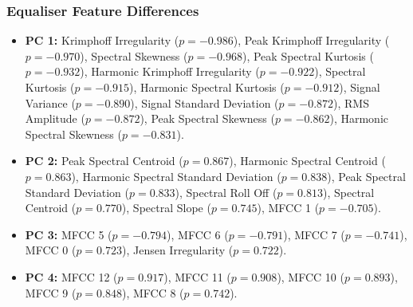 		\subsubsection*{Equaliser Feature Differences}
			\begin{itemize}
				\item {\bf{PC 1:}} Krimphoff Irregularity ($p = -0.986$), Peak Krimphoff Irregularity ($p =
					-0.970$), Spectral Skewness ($p = -0.968$), Peak Spectral Kurtosis ($p = -0.932$),
					Harmonic Krimphoff Irregularity ($p = -0.922$), Spectral Kurtosis ($p = -0.915$),
					Harmonic Spectral Kurtosis ($p = -0.912$), Signal Variance ($p = -0.890$), Signal
					Standard Deviation ($p = -0.872$), RMS Amplitude ($p = -0.872$), Peak Spectral
					Skewness ($p = -0.862$), Harmonic Spectral Skewness ($p = -0.831$).
				\item {\bf{PC 2:}} Peak Spectral Centroid ($p =  0.867$), Harmonic Spectral Centroid ($p =
					0.863$), Harmonic Spectral Standard Deviation ($p =  0.838$), Peak Spectral
					Standard Deviation ($p =  0.833$), Spectral Roll Off ($p =  0.813$), Spectral
					Centroid ($p =  0.770$), Spectral Slope ($p =  0.745$), MFCC 1 ($p = -0.705$).
				\item {\bf{PC 3:}} MFCC 5 ($p = -0.794$), MFCC 6 ($p = -0.791$), MFCC 7 ($p = -0.741$),
					MFCC 0 ($p =  0.723$), Jensen Irregularity ($p =  0.722$).
				\item {\bf{PC 4:}} MFCC 12 ($p = 0.917$), MFCC 11 ($p = 0.908$), MFCC 10 ($p = 0.893$),
					MFCC 9 ($p = 0.848$), MFCC 8 ($p = 0.742$).
			\end{itemize}

